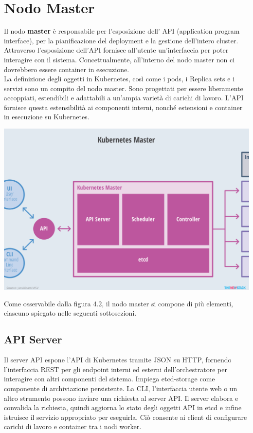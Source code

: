 \documentclass[12pt, a4paper]{report}
\begin{document}
\section{Nodo Master}
Il nodo \textbf{master} è responsabile per l'esposizione dell' API (application program interface), per la pianificazione del deployment e la gestione dell'intero cluster. Attraverso l'esposizione dell'API fornisce all'utente un'interfaccia per poter interagire con il sistema. Concettualmente, all'interno del nodo master non ci dovrebbero essere container in esecuzione.\\
La definizione degli oggetti in Kubernetes, così come i pods, i Replica sets e i servizi sono un compito del nodo master. Sono progettati per essere liberamente accoppiati, estendibili e adattabili a un'ampia varietà di carichi di lavoro. L'API fornisce questa estensibilità ai componenti interni, nonché estensioni e container in esecuzione su Kubernetes.
\begin{center}
  \includegraphics[scale=0.5]{Images/Kubernetes-master}
\end{center}
Come osservabile dalla figura 4.2, il nodo master si compone di più elementi, ciascuno spiegato nelle seguenti sottosezioni.
\subsection{API Server}
Il server API espone l'API di Kubernetes tramite JSON su HTTP, fornendo l'interfaccia REST per gli endpoint interni ed esterni dell'orchestratore per interagire con altri componenti del sistema. Impiega etcd-storage come componente di archiviazione persistente. La CLI, l'interfaccia utente web o un altro strumento possono inviare una richiesta al server API. Il server elabora e convalida la richiesta, quindi aggiorna lo stato degli oggetti API in etcd e infine istruisce il servizio appropriato per eseguirla. Ciò consente ai client di configurare carichi di lavoro e container tra i nodi worker.
\end{document}

